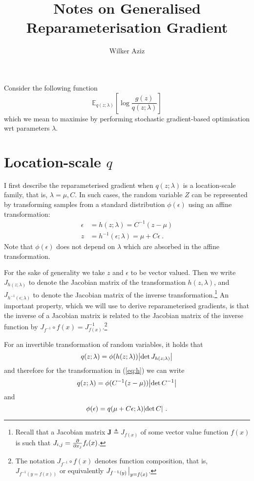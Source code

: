\documentclass[11pt]{article}
\title{Notes on Generalised Reparameterisation Gradient}
\author{Wilker Aziz}
\begin{document}
\maketitle

Consider the following function
\begin{equation}\label{eq:objective}
	\mathbb E_{q(z; \lambda)} \left [ \log \frac{g(z)}{q(z; \lambda)} \right]
\end{equation}
which we mean to maximise by performing stochastic gradient-based optimisation wrt parameters $\lambda$.


\section{Location-scale $q$}


I first describe the reparameterised gradient when $q(z; \lambda)$ is a location-scale family, that is, $\lambda = {\mu, C}$.
In such cases, the random variable $Z$ can be represented by transforming samples from a standard distribution $\phi(\epsilon)$ using an affine transformation:
\begin{subequations}\label{eq:h}
\begin{align}
\epsilon &= h(z; \lambda) = C^{-1} (z - \mu)  \\
z &= h^{-1}(\epsilon; \lambda) = \mu + C\epsilon ~ .
\end{align}
\end{subequations}
Note that $\phi(\epsilon)$ does not depend on $\lambda$ which are absorbed in the affine transformation.

For the sake of generality we take $z$ and $\epsilon$ to be vector valued. 
Then we write $J_{h(z; \lambda)}$ to denote the Jacobian matrix of the transformation $h(z, \lambda)$, and $J_{h^{-1}(\epsilon; \lambda)}$ to denote the Jacobian matrix of the inverse transformation.\footnote{Recall that a Jacobian matrix $\mathbf J \triangleq J_{f(x)}$ of some vector value function $f(x)$ is such that $J_{i,j} = \pdv{x_j} f_i(x)$.} 
An important property, which we will use to derive reparameterised gradients, is that the inverse of a Jacobian matrix is related to the Jacobian matrix of the inverse function by $J_{f^{-1}} \circ f(x)= J^{-1}_{f(x)}$.\footnote{The notation $J_{f^{-1}} \circ f(x)$ denotes function composition, that is, $J_{f^{-1}(y=f(x))}$ or equivalently $J_{f^{-1}(y)}\evaluated_{y=f(x)}$.}

For an invertible transformation of random variables, it holds that %
\begin{equation}
q(z;\lambda) = \phi(h(z; \lambda))\abs{\det J_{h(z; \lambda)}}
\end{equation}
and therefore for the transformation in (\ref{eq:h}) we can write
\begin{equation}
q(z;\lambda) = \phi(C^{-1}(z - \mu))\abs{\det C^{-1}} 
\end{equation}
and
\begin{equation}
\phi(\epsilon) = q(\mu + C\epsilon; \lambda)\abs{\det C} ~ .
\end{equation}
\end{document}
